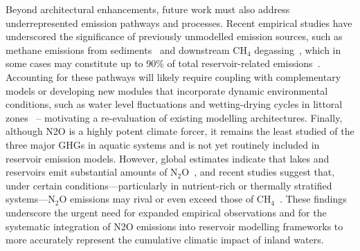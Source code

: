 \documentclass[final,1p,times]{elsarticle}
\begin{document}
Beyond architectural enhancements, future work must also address underrepresented emission pathways and processes. 
Recent empirical studies have underscored the significance of previously unmodelled emission sources, such as methane emissions from sediments~\cite{gruca2011, Isidorova2019-ft} and downstream CH$_4$ degassing~\cite{Soued2022, Zhou2024}, which in some cases may constitute up to 90\% of total reservoir-related emissions~\cite{Deshmukh}. 
Accounting for these pathways will likely require coupling with complementary models or developing new modules that incorporate dynamic environmental conditions, such as water level fluctuations and wetting-drying cycles in littoral zones~\cite{Calamita2021, Ion2021} -- motivating a re-evaluation of existing modelling architectures.
Finally, although \acf{N2O} is a highly potent climate forcer, it remains the least studied of the three major \acp{GHG} in aquatic systems and is not yet routinely included in reservoir emission models. 
However, global estimates indicate that lakes and reservoirs emit substantial amounts of N$_2$O~\cite{Li2024}, and recent studies suggest that, under certain conditions—particularly in nutrient-rich or thermally stratified systems—N$_2$O emissions may rival or even exceed those of CH$_4$~\cite{Chen2025}. These findings underscore the urgent need for expanded empirical observations and for the systematic integration of \ac{N2O} emissions into reservoir modelling frameworks to more accurately represent the cumulative climatic impact of inland waters.
\end{document}
